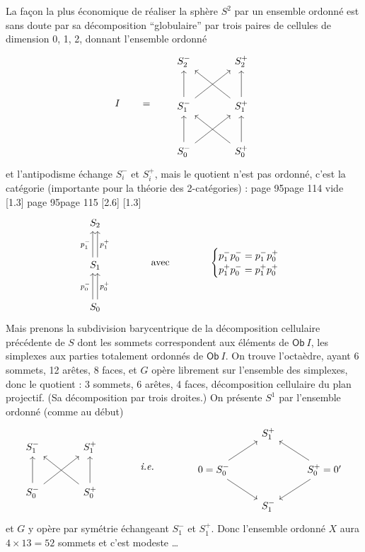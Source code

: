 \documentclass[11pt,leqno]{article}
\newcommand{\msp}[1]{%
  \begingroup\def\thismsp{#1}\def\blankmsp{page 114 vide}%
  \ifx\thismsp\blankmsp
    \marginnote{\scriptsize\sffamily [114: vide]}[1.3\baselineskip]%
  \else\def\followingmsp{page 115}%
    \ifx\thismsp\followingmsp
      \marginnote{\scriptsize\sffamily [page 115]}[2.6\baselineskip]%
    \else\marginnote{\scriptsize\sffamily [#1]}[1.3\baselineskip]\fi
  \fi\endgroup}
\begin{document}
La façon la plus économique de réaliser la sphère $S^2$ par un ensemble ordonné est sans doute par sa décomposition ``globulaire'' par trois paires de cellules de dimension 0, 1, 2, donnant l'ensemble ordonné
\[
I \qquad = \qquad
\begin{tikzcd}[row sep=large, column sep=large]
S_2^- & S_2^+ \\
S_1^- \arrow[u] \arrow[ur] & S_1^+ \arrow[u] \arrow[ul] \\
S_0^- \arrow[u] \arrow[ur] & S_0^+ \arrow[u] \arrow[ul]
\end{tikzcd}
\]
et l'antipodisme échange $S_i^-$ et $S_i^+$, mais le quotient n'est pas ordonné, c'est la catégorie (importante pour la théorie des 2-catégories) :
\msp{page 95}
\[
\begin{tikzcd}[row sep=large]
S_2 \\
S_1 \arrow[u, shift left, "p_1^-"] \arrow[u, shift right, "p_1^+"'] \\
S_0 \arrow[u, shift left, "p_0^-"] \arrow[u, shift right, "p_0^+"']
\end{tikzcd}
\qquad\qquad \text{avec} \qquad\qquad
\begin{cases}
p_1^- p_0^- = p_1^- p_0^+ \\
p_1^+ p_0^- = p_1^+ p_0^+
\end{cases}
\]
Mais prenons la subdivision barycentrique de la décomposition cellulaire précédente de $S$ dont les sommets correspondent aux éléments de $\mathsf{Ob}\ I$, les simplexes aux parties totalement ordonnés de $\mathsf{Ob}\ I$. On trouve l'octaèdre, ayant 6 sommets, 12 arêtes, 8 faces, et $G$ opère librement sur l'ensemble des simplexes, donc le quotient : 3 sommets, 6 arêtes, 4 faces, décomposition cellulaire du plan projectif. (Sa décomposition par trois droites.) On présente $S^1$ par l'ensemble ordonné (comme au début) %
\[
\begin{tikzcd}[row sep=large, column sep=large]
S_1^- & S_1^+ \\
S_0^- \arrow[u] \arrow[ur] & S_0^+ \arrow[u] \arrow[ul]
\end{tikzcd}
\qquad\qquad \textit{i.e.} \qquad\qquad
\begin{tikzcd}
 & S_1^+ & \\
0 = S_0^- \arrow[ur] \arrow[dr] & & S_0^+ = 0' \arrow[ul] \arrow[dl] \\
 & S_1^- &
\end{tikzcd}
\]
et $G$ y opère par symétrie échangeant $S_1^-$ et $S_1^+$. Donc l'ensemble ordonné $X$ aura $4 \times 13 = 52$ sommets et c'est modeste \ldots
\end{document}
